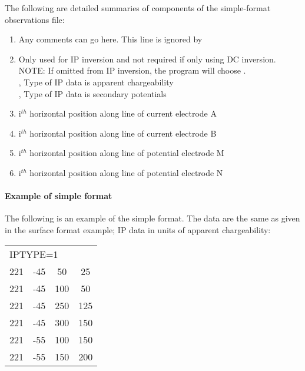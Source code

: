 The following are detailed summaries of components of the simple-format observations file:
\begin{enumerate}
\item[\codeName{Comment Line}] Any comments can go here. This line is ignored by 
\item[\codeName{IPTYPE}] Only used for IP inversion and not required if only using DC inversion. NOTE: If omitted from IP inversion, the program will choose . \\
     , Type of IP data is apparent chargeability \\
		 , Type of IP data is secondary potentials
%
\item[\codeName{A$_i^x$}] i$^{th}$ horizontal position along line of current electrode A
\item[\codeName{B$_i^x$}] i$^{th}$ horizontal position along line of current electrode B
\item[\codeName{M$_j^x$}] i$^{th}$ horizontal position along line of potential electrode M
\item[\codeName{N$_j^x$}] i$^{th}$ horizontal position along line of potential electrode N
\end{enumerate}

\paragraph{Example of simple format}

The following is an example of the simple format. The data are the same as given in the surface format example; IP data in units of apparent chargeability:

\begin{fileExample}
\begin{tabular}{|cccc|}
\hline
\multicolumn{4}{|l|}{IPTYPE=1} \\
221 & -45 &  50 &  25 \\
221 & -45 & 100 &  50 \\
221 & -45 & 250 & 125  \\
221 & -45 & 300 & 150 \\
221 & -55 & 100 & 150\\
221 & -55 & 150 & 200  \\
\hline
\end{tabular}
\end{fileExample}